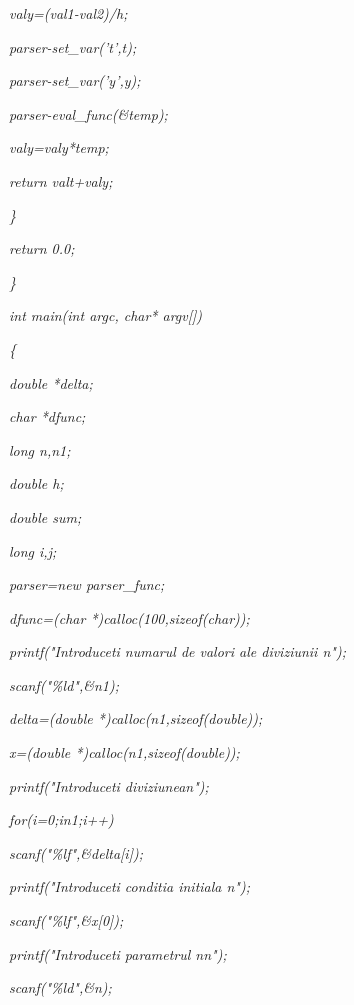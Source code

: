 \documentclass[a4paper,twoside]{book}
\begin{document}
\textit{\qquad \qquad \qquad valy=(val1-val2)/h;}

\textit{\qquad \qquad \qquad parser-\TEXTsymbol{>}set\_var('t',t);}

\textit{\qquad \qquad \qquad parser-\TEXTsymbol{>}set\_var('y',y);}

\textit{\qquad \qquad \qquad parser-\TEXTsymbol{>}eval\_func(\&temp);}

\textit{\qquad \qquad \qquad valy=valy*temp;}

\textit{\qquad \qquad \qquad return valt+valy;}

\textit{\qquad \}}

\textit{\qquad return 0.0;}

\textit{\}}

\textit{int main(int argc, char* argv[])}

\textit{\{}

\textit{\qquad double *delta;}

\textit{\qquad char *dfunc;}

\textit{\qquad long n,n1;}

\textit{\qquad double h;}

\textit{\qquad double sum;}

\textit{\qquad long i,j;}

\textit{\qquad parser=new parser\_func;}

\textit{\qquad dfunc=(char *)calloc(100,sizeof(char));}

\textit{\qquad printf("Introduceti numarul de valori ale diviziunii%
\TEXTsymbol{\backslash}n");}

\textit{\qquad scanf("\%ld",\&n1);}

\textit{\qquad delta=(double *)calloc(n1,sizeof(double));}

\textit{\qquad x=(double *)calloc(n1,sizeof(double));}

\textit{\qquad printf("Introduceti diviziunea\TEXTsymbol{\backslash}n");}

\textit{\qquad for(i=0;i\TEXTsymbol{<}n1;i++)}

\textit{\qquad \qquad scanf("\%lf",\&delta[i]);}

\textit{\qquad printf("Introduceti conditia initiala\TEXTsymbol{\backslash}%
n");}

\textit{\qquad scanf("\%lf",\&x[0]);}

\textit{\qquad printf("Introduceti parametrul n\TEXTsymbol{\backslash}n");}

\textit{\qquad scanf("\%ld",\&n);}
\end{document}
